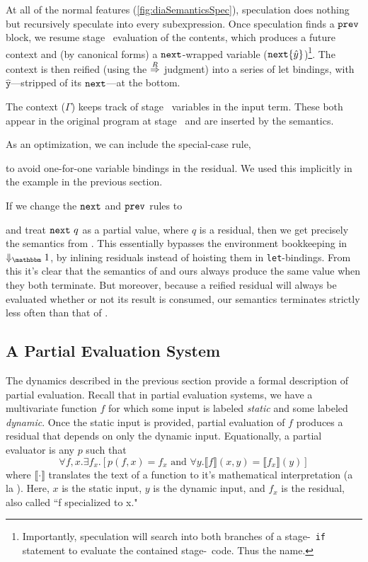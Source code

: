 At all of the normal features (\ref{fig:diaSemanticsSpec}), speculation does
nothing but recursively speculate into every subexpression.  Once speculation
finds a $\prev$ block, we resume stage \bbone\ evaluation of the contents, which
produces a future context and (by canonical forms) a $\next$-wrapped variable
($\next\{\hat y\}$)\footnote{
Importantly, speculation will search into both branches of a stage-\bbtwo\ {\tt if}
statement to evaluate the contained stage-\bbone\ code.  Thus the name.
}.  The context is then reified (using the $\reifysym$
judgment) into a series of let bindings, with $\mathtt{\hat y}$---stripped of
its $\next$---at the bottom.

The context ($\Gamma$) keeps track of stage \bbtwo\ variables in the input term. 
These both appear in the original program at stage \bbtwo\ and are inserted by the semantics.

As an optimization, we can include the special-case rule,
\begin{mathpar}
\end{mathpar}
to avoid one-for-one variable bindings in the residual.
We used this implicitly in the example in the previous section.

If we change the $\next$ and $\prev$ rules to 
and treat $\next~q$ as a partial value, where $q$ is a residual,
then we get precisely the semantics from \cite{davies96}. This essentially bypasses the
environment bookkeeping in $\redonesym$, by inlining residuals instead of
hoisting them in \verb|let|-bindings.
From this it's clear that the semantics of \cite{davies96} and ours always produce the same value when they both terminate.
But moreover, because a reified residual will always be evaluated whether or not its result is consumed, 
our semantics terminates strictly less often than that of \cite{davies96}.

\subsection {A Partial Evaluation System}
\label{sec:partialeval}

The dynamics described in the previous section provide a formal description of partial evaluation.
Recall that in partial evaluation systems, we have a multivariate function $f$ for which some input is labeled {\em static} and 
some labeled {\em dynamic}.  Once the static input is provided, partial evaluation of $f$ produces
a residual that depends on only the dynamic input.  Equationally, a partial evaluator is any $p$ such that
\[
	\forall f,x. \exists f_x. [p(f,x) = f_x \text{ and } \forall y.\llbracket f \rrbracket(x,y)=\llbracket f_x \rrbracket(y)]
\]
where $\llbracket \cdot \rrbracket$ translates the text of a function to it's mathematical interpretation (a la \cite{jones96}).
Here, $x$ is the static input, $y$ is the dynamic input, and $f_x$ is the residual, also called ``f specialized to x."

